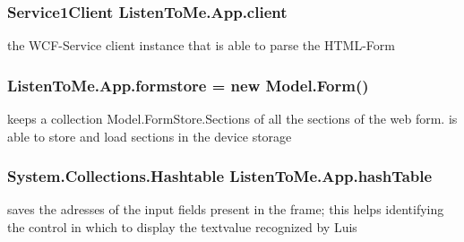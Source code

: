 \subsubsection[{\texorpdfstring{client}{client}}]{\setlength{\rightskip}{0pt plus 5cm}Service1\+Client Listen\+To\+Me.\+App.\+client\hspace{0.3cm}{\ttfamily [static]}}\hypertarget{class_listen_to_me_1_1_app_a41b762ac78fada5d35954d39419b8e36}{}\label{class_listen_to_me_1_1_app_a41b762ac78fada5d35954d39419b8e36}


the W\+C\+F-\/\+Service client instance that is able to parse the H\+T\+M\+L-\/\+Form 

\subsubsection[{\texorpdfstring{formstore}{formstore}}]{ Listen\+To\+Me.\+App.\+formstore = new {\bf Model.\+Form}()\hspace{0.3cm}{\ttfamily [static]}}\hypertarget{class_listen_to_me_1_1_app_a3e094e220103fe4590cf50c22f38ee65}{}\label{class_listen_to_me_1_1_app_a3e094e220103fe4590cf50c22f38ee65}


keeps a collection Model.\+Form\+Store.\+Sections of all the sections of the web form. is able to store and load sections in the device storage 

\subsubsection[{\texorpdfstring{hash\+Table}{hashTable}}]{\setlength{\rightskip}{0pt plus 5cm}System.\+Collections.\+Hashtable Listen\+To\+Me.\+App.\+hash\+Table\hspace{0.3cm}{\ttfamily [static]}}\hypertarget{class_listen_to_me_1_1_app_a311ccaa1ae0fd9cf9f89d3e3466098fe}{}\label{class_listen_to_me_1_1_app_a311ccaa1ae0fd9cf9f89d3e3466098fe}


saves the adresses of the input fields present in the frame; this helps identifying the control in which to display the textvalue recognized by Luis 



